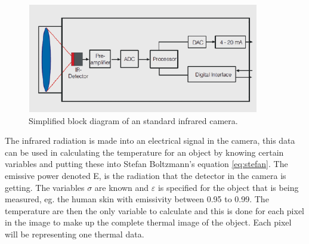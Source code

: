 \begin{figure}[H]                                         
	\includegraphics[width=.55\textwidth]{figures/IR_cam}  
	\caption{Simplified block diagram of an standard infrared camera.\cite{optris2009}}
	\label{fig:em_spectrum}  
\end{figure} 

The infrared radiation is made into an electrical signal in the camera, this data can be used in calculating the temperature for an object by knowing certain variables and putting these into Stefan Boltzmann's equation \ref{eq:stefan}. The emissive power denoted E, is the radiation that the detector in the camera is getting. The variables $\sigma$ are known and $\varepsilon$ is specified for the object that is being measured, eg. the human skin with emissivity between 0.95 to 0.99. The temperature are then the only variable to calculate and this is done for each pixel in the image to make up the complete thermal image of the object. Each pixel will be representing one thermal data. \cite{ignacio2017}







